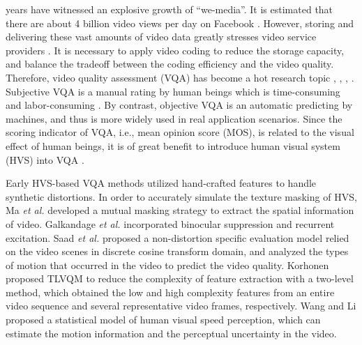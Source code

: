 \documentclass[journal]{IEEEtran}
\begin{document}
 years have witnessed an explosive growth of
``we-media''.
It is estimated that there are about 4 billion video views per day on Facebook \cite{Facebook}. However, storing and delivering these vast amounts of video data
greatly stresses video service providers \cite{Mao2022}.
It is necessary to apply video coding to
reduce the storage capacity, and balance the tradeoff between the coding efficiency and the video quality.
Therefore, video quality assessment (VQA) has become a hot research topic \cite{Zhang2019}, \cite{Wu2021}, \cite{CSPT}, \cite{Xing2022}.
Subjective VQA is a manual rating by human beings which is time-consuming and labor-consuming \cite{Ou2021}.
By contrast, objective VQA is an automatic predicting by machines, and thus is more widely used in real application scenarios.
Since the scoring indicator of VQA, i.e., mean opinion score (MOS), is related to the visual effect of human beings, it is of great benefit to introduce human visual system (HVS) into VQA \cite{Xian2022,Zhang2022}.

Early HVS-based VQA methods utilized hand-crafted features to handle synthetic distortions.
In order to accurately simulate the texture masking of HVS, Ma \emph{et al.} \cite{Ma2013} developed a mutual masking strategy to extract the spatial information of video. Galkandage \emph{et al.} \cite{Galkandage2017} incorporated binocular suppression and recurrent excitation.
Saad \emph{et al.} \cite{VBLIINDS} proposed a non-distortion specific evaluation model relied on the video scenes in discrete cosine transform domain, and analyzed the types of motion that occurred in the video to predict the video quality.
Korhonen proposed TLVQM \cite{TLVQM} to reduce the complexity of feature extraction with a two-level method, which obtained the low and high complexity features from an entire video sequence and several representative video frames, respectively.
Wang and Li \cite{Wang2007} proposed a statistical model of human visual speed perception, which can estimate the motion information and the perceptual uncertainty in the video.
\end{document}
